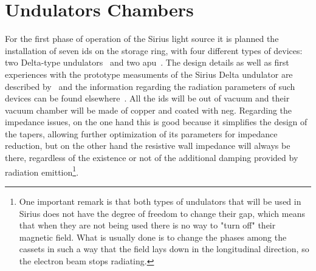 \section{Undulators Chambers}\label{sec:undulators_chambers}

    For the first phase of operation of the Sirius light source it is planned the installation of seven \glspl{id} on the storage ring, with four different types of devices: two Delta-type undulators~\cite{Temnykh2008} and two \gls{apu}~\cite{Carr1991}. The design details as well as first experiences with the prototype measuments of the Sirius Delta undulator are described by~ and the information regarding the radiation parameters of such devices can be found elsewhere~\cite{Sirius2013}. All the \glspl{id} will be out of vacuum and their vacuum chamber will be made of copper and coated with \gls{neg}. Regarding the impedance issues, on the one hand this is good because it simplifies the design of the tapers, allowing further optimization of its parameters for impedance reduction, but on the other hand the resistive wall impedance will always be there, regardless of the existence or not of the additional damping provided by radiation emittion\footnote{One important remark is that both types of undulators that will be used in Sirius does not have the degree of freedom to change their gap, which means that when they are not being used there is no way to "turn off" their magnetic field. What is usually done is to change the phases among the~ cassets in such a way that the field lays down in the longitudinal direction, so the electron beam stops radiating.}.

